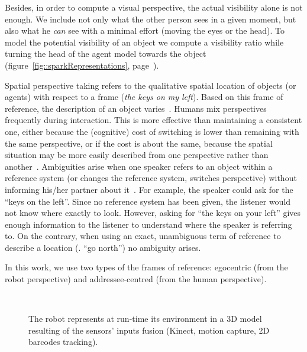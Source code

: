 Besides, in order to compute a visual perspective, the actual visibility alone
is not enough. We include not only what the other person sees in a given
moment, but also what he \emph{can} see with a minimal effort (moving the eyes
or the head). To model the potential visibility of an object we compute a
visibility ratio while turning the head of the agent model towards the object
(figure~\ref{fig::sparkRepresentations},
page~\pageref{fig::sparkRepresentations}).

Spatial perspective taking refers to the qualitative spatial location of
objects (or agents) with respect to a frame (\eg \emph{the keys on my left}).
Based on this frame of reference, the description of an object
varies~\cite{Marin2008}. Humans mix perspectives frequently during interaction.
This is more effective than maintaining a consistent one, either because the
(cognitive) cost of switching is lower than remaining with the same
perspective, or if the cost is about the same, because the spatial situation
may be more easily described from one perspective rather than
another~\cite{Tversky1999}. Ambiguities arise when one speaker refers to an
object within a reference system (or changes the reference system, \ie switches
perspective) without informing his/her partner about it~\cite{Breazeal2006,
Ros2010}. For example, the speaker could ask for the ``keys on the left''.
Since no reference system has been given, the listener would not know where
exactly to look.  However, asking for ``the keys on your left'' gives enough
information to the listener to understand where the speaker is referring to. On
the contrary, when using an exact, unambiguous term of reference to describe a
location (\eg. ``go north'') no ambiguity arises.

In this work, we use two types of the frames of reference: egocentric (from the
robot perspective) and addressee-centred (from the human perspective).

\begin{figure}[ht!]
   \begin{center}
%
       \\ %
%
   \end{center}

   \caption{The robot represents at run-time its environment in a 3D model
   resulting of the sensors' inputs fusion (Kinect, motion capture, 2D barcodes
   tracking).}

   \label{fig|spark}

\end{figure}

